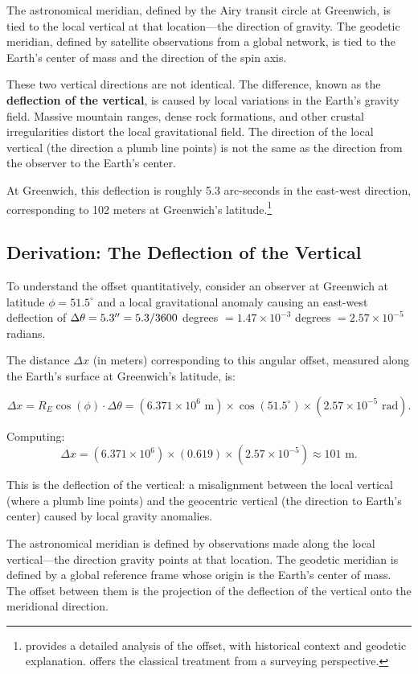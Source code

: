 The astronomical meridian, defined by the Airy transit circle at Greenwich, is tied to the local vertical at that location---the direction of gravity. The geodetic meridian, defined by satellite observations from a global network, is tied to the Earth's center of mass and the direction of the spin axis.

These two vertical directions are not identical. The difference, known as the \textbf{deflection of the vertical}, is caused by local variations in the Earth's gravity field. Massive mountain ranges, dense rock formations, and other crustal irregularities distort the local gravitational field. The direction of the local vertical (the direction a plumb line points) is not the same as the direction from the observer to the Earth's center.

At Greenwich, this deflection is roughly 5.3 arc-seconds in the east-west direction, corresponding to 102 meters at Greenwich's latitude.\footnote{\textcite{Malys2015} provides a detailed analysis of the offset, with historical context and geodetic explanation. \textcite{Levallois1986} offers the classical treatment from a surveying perspective.}

\subsection{Derivation: The Deflection of the Vertical}

To understand the offset quantitatively, consider an observer at Greenwich at latitude $\phi = 51.5^{\circ}$ and a local gravitational anomaly causing an east-west deflection of $\Delta \theta = 5.3^{\prime\prime} = 5.3/3600$ degrees $= 1.47 \times 10^{-3}$ degrees $= 2.57 \times 10^{-5}$ radians.

The distance $\Delta x$ (in meters) corresponding to this angular offset, measured along the Earth's surface at Greenwich's latitude, is:

\[
  \Delta x = R_E \cos(\phi) \cdot \Delta \theta = (6.371 \times 10^6 \text{ m}) \times \cos(51.5^{\circ}) \times (2.57 \times 10^{-5} \text{ rad}).
\]

Computing:
\[
  \Delta x = (6.371 \times 10^6) \times (0.619) \times (2.57 \times 10^{-5}) \approx 101 \text{ m}.
\]

This is the deflection of the vertical: a misalignment between the local vertical (where a plumb line points) and the geocentric vertical (the direction to Earth's center) caused by local gravity anomalies.

The astronomical meridian is defined by observations made along the local vertical---the direction gravity points at that location. The geodetic meridian is defined by a global reference frame whose origin is the Earth's center of mass. The offset between them is the projection of the deflection of the vertical onto the meridional direction.

